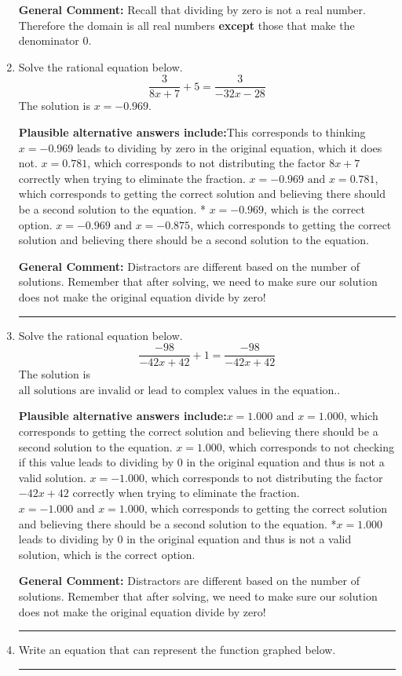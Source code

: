 \documentclass{extbook}[14pt]
\newcommand{\litem}[1]{\item #1

\rule{\textwidth}{0.4pt}}
\begin{document}
\begin{enumerate}
{\textbf{General Comment:} Recall that dividing by zero is not a real number. Therefore the domain is all real numbers \textbf{except} those that make the denominator 0.
}
\litem{
Solve the rational equation below.
\[ \frac{3}{8x + 7} + 5 = \frac{3}{-32x -28} \]The solution is \( x = -0.969 \).\begin{enumerate}[label=\Alph*.]
\textbf{Plausible alternative answers include:}This corresponds to thinking $x = -0.969$ leads to dividing by zero in the original equation, which it does not.
$x = 0.781$, which corresponds to not distributing the factor $8x + 7$ correctly when trying to eliminate the fraction.
$x = -0.969 \text{ and } x = 0.781$, which corresponds to getting the correct solution and believing there should be a second solution to the equation.
* $x = -0.969$, which is the correct option.
$x = -0.969 \text{ and } x = -0.875$, which corresponds to getting the correct solution and believing there should be a second solution to the equation.
\end{enumerate}

\textbf{General Comment:} Distractors are different based on the number of solutions. Remember that after solving, we need to make sure our solution does not make the original equation divide by zero!
}
\litem{
Solve the rational equation below.
\[ \frac{-98}{-42x + 42} + 1 = \frac{-98}{-42x + 42} \]The solution is \( \text{all solutions are invalid or lead to complex values in the equation.} \).\begin{enumerate}[label=\Alph*.]
\textbf{Plausible alternative answers include:}$x = 1.000 \text{ and } x = 1.000$, which corresponds to getting the correct solution and believing there should be a second solution to the equation.
$x = 1.000$, which corresponds to not checking if this value leads to dividing by 0 in the original equation and thus is not a valid solution.
$x = -1.000$, which corresponds to not distributing the factor $-42x + 42$ correctly when trying to eliminate the fraction.
$x = -1.000 \text{ and } x = 1.000$, which corresponds to getting the correct solution and believing there should be a second solution to the equation.
*$x = 1.000$ leads to dividing by 0 in the original equation and thus is not a valid solution, which is the correct option.
\end{enumerate}

\textbf{General Comment:} Distractors are different based on the number of solutions. Remember that after solving, we need to make sure our solution does not make the original equation divide by zero!
}
\litem{
Write an equation that can represent the function graphed below.

}
\end{enumerate}
\end{document}
